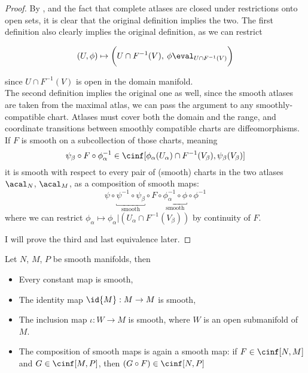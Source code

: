 \documentclass[../main-v2-manifolds.tex]{subfiles}
\begin{document}
\begin{proof}
    By , and the fact that complete atlases are closed under restrictions onto open sets, it is clear that the original definition implies the two. The first definition also clearly implies the original definition, as we can restrict 
    
    \[(U,\phi)\mapsto \biggl(U\cap F^{-1}(V),\: \phi\eval_{U\cap F^{-1}(V)}\biggr)\]
    
    since $U\cap F^{-1}(V)$ is open in the domain manifold.\\

    The second definition implies the original one as well, since the smooth atlases are taken from the maximal atlas, we can pass the argument to any smoothly-compatible chart. Atlases must cover both the domain and the range, and coordinate transitions between smoothly compatible charts are diffeomorphisms. If $F$ is smooth on a subcollection of those charts, meaning
    \[
        \psi_\beta\circ F\circ\phi_\alpha^{-1}\in \cinf[\phi_\alpha(U_\alpha)\cap F^{-1}(V_\beta),\psi_\beta(V_\beta)]
    \]
    it is smooth with respect to every pair of (smooth) charts in the two atlases $\acal_{N}$, $\acal_{M}$, as a composition of smooth maps:
    \[
        \psi\circ \underbracket{\psi^{-1}\circ \psi_\beta}_{\text{smooth}}\circ F\circ\underbracket{\phi_\alpha^{-1}\circ \phi}_{\text{smooth}}\circ\phi^{-1}
    \]
    where we can restrict $\phi_\alpha\mapsto \phi_\alpha|(U_\alpha\cap F^{-1}(V_\beta))$ by continuity of $F$.

    I will prove the third and last equivalence later.
\end{proof}
\begin{wts}\label{lee-chp2:sources-of-smooth-maps}
    Let $N$, $M$, $P$ be smooth manifolds, then
    \begin{itemize}
        \item Every constant map is smooth,
        \item The identity map $\id{M}:M\to M$ is smooth,
        \item The inclusion map $\iota: W\to M$ is smooth, where $W$ is an open submanifold of $M$.
        \item The composition of smooth maps is again a smooth map: if $F\in \cinf[N,M]$ and $G\in \cinf[M,P]$, then $(G\circ F)\in\cinf[N,P]$
    \end{itemize}
\end{wts}
\end{document}
